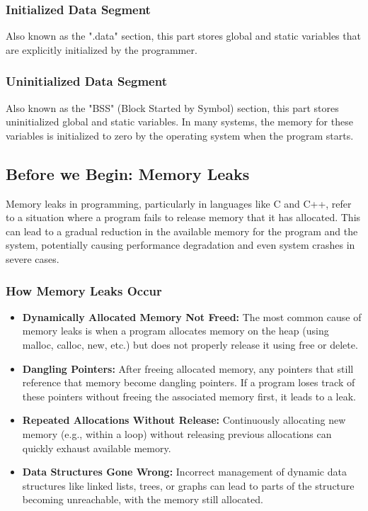 \documentclass{report}
\begin{document}
    \subsubsection{Initialized Data Segment}
    \bigbreak \noindent 
    Also known as the ".data" section, this part stores global and static variables that are explicitly initialized by the programmer.
    
    \bigbreak \noindent 
    \subsubsection{Uninitialized Data Segment}
    \bigbreak \noindent 
    Also known as the "BSS" (Block Started by Symbol) section, this part stores uninitialized global and static variables. In many systems, the memory for these variables is initialized to zero by the operating system when the program starts.

    \pagebreak 
    \bigbreak \noindent 
    \subsection{Before we Begin: Memory Leaks}
    \bigbreak \noindent 
    \begin{concept}
    Memory leaks in programming, particularly in languages like C and C++, refer to a situation where a program fails to release memory that it has allocated. This can lead to a gradual reduction in the available memory for the program and the system, potentially causing performance degradation and even system crashes in severe cases.

    \end{concept}
    \bigbreak \noindent 
    \subsubsection{How Memory Leaks Occur}
    \begin{itemize}
        \item \textbf{Dynamically Allocated Memory Not Freed:} The most common cause of memory leaks is when a program allocates memory on the heap (using malloc, calloc, new, etc.) but does not properly release it using free or delete.
        \item \textbf{Dangling Pointers:} After freeing allocated memory, any pointers that still reference that memory become dangling pointers. If a program loses track of these pointers without freeing the associated memory first, it leads to a leak.
        \item \textbf{Repeated Allocations Without Release:} Continuously allocating new memory (e.g., within a loop) without releasing previous allocations can quickly exhaust available memory.
        \item \textbf{Data Structures Gone Wrong:} Incorrect management of dynamic data structures like linked lists, trees, or graphs can lead to parts of the structure becoming unreachable, with the memory still allocated.
    \end{itemize}
    
\end{document}
